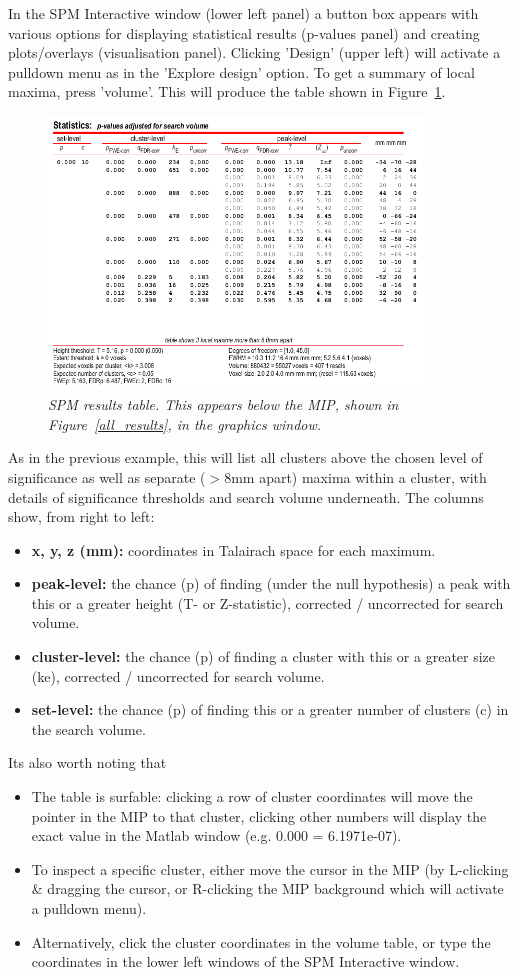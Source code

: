 In the SPM Interactive window (lower left panel) a button box appears with various options for displaying statistical results (p-values panel) and creating plots/overlays (visualisation panel). Clicking 'Design' (upper left) will activate a pulldown menu as in the 'Explore design' option. To get a summary of local maxima, press 'volume'. This will produce the table shown in Figure~\ref{table}.
\begin{figure}
\begin{center}
\includegraphics[width=100mm]{pet/table}
\caption{\em SPM results table. This appears below the MIP, shown in Figure~\ref{all_results}, in the graphics window. \label{table}}
\end{center}
\end{figure}
As in the previous example, this will list all clusters above the chosen level of significance as well as separate ($>$8mm apart) maxima within a cluster, with details of significance thresholds and search volume underneath. The columns show, from right to left:
\begin{itemize}
\item{\textbf{x, y, z (mm):} coordinates in Talairach space for each maximum.}
\item{\textbf{peak-level:} the chance (p) of finding (under the null hypothesis) a peak with this or a greater height (T- or Z-statistic), corrected / uncorrected for search volume.}
\item{\textbf{cluster-level:} the chance (p) of finding a cluster with this or a greater size (ke), corrected / uncorrected for search volume.}
\item{\textbf{set-level:} the chance (p) of finding this or a greater number of clusters (c) in the search volume.}
\end{itemize}
Its also worth noting that
\begin{itemize}
\item{The table is surfable: clicking a row of cluster coordinates will move the pointer in the MIP to that cluster, clicking other numbers will display the exact value in the Matlab window (e.g. 0.000 = 6.1971e-07).}
\item{To inspect a specific cluster, either move the cursor in the MIP (by L-clicking \& dragging the cursor, or R-clicking the MIP background which will activate a pulldown menu).}
\item{Alternatively, click the cluster coordinates in the volume table, or type the coordinates in the lower left windows of the SPM Interactive window.}
\end{itemize}
